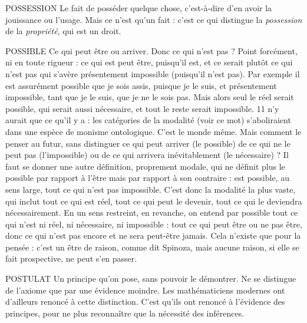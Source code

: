 POSSESSION Le fait de posséder quelque chose, c’est-à-dire d’en avoir la
jouissance ou l’usage. Mais ce n’est qu’un fait : c’est ce qui
distingue la {\it possession} de la {\it propriété}, qui est un droit.

POSSIBLE Ce qui peut être ou arriver. Donc ce qui n’est pas ? Point forcément,
ni en toute rigueur : ce qui est peut être, puisqu'il est, et
ce serait plutôt ce qui n’est pas qui s’avère présentement impossible (puisqu'il
n'est pas). Par exemple il est assurément possible que je sois assis, puisque je le
suis, et présentement impossible, tant que je le suis, que je ne le sois pas. Mais
alors seul le réel serait possible, qui serait aussi nécessaire, et tout le reste serait
impossible. 11 n’y aurait que ce qu’il y a : les catégories de la modalité (voir ce
mot) s’aboliraient dans une espèce de monisme ontologique. C’est le monde
même. Mais comment le penser au futur, sans distinguer ce qui peut arriver (le
possible) de ce qui ne le peut pas (l’impossible) ou de ce qui arrivera inévitablement
(le nécessaire) ? Il faut se donner une autre définition, proprement
modale, qui ne définit plus le possible par rapport à l'être mais par rapport à
son contraire : est possible, au sens large, tout ce qui n’est pas impossible. C’est
donc la modalité la plus vaste, qui inclut tout ce qui est réel, tout ce qui peut
le devenir, tout ce qui le deviendra nécessairement. En un sens restreint, en
revanche, on entend par possible tout ce qui n’est ni réel, ni nécessaire, ni
impossible : tout ce qui peut être ou ne pas être, donc ce qui n’est pas encore
et ne sera peut-être jamais. Cela n'existe que pour la pensée : c’est un être de
raison, comme dit Spinoza, mais aucune raison, si elle se fait prospective, ne
peut s’en passer.

POSTULAT Un principe qu’on pose, sans pouvoir le démontrer. Ne se distingue
de l’axiome que par une évidence moindre. Les mathématiciens
modernes ont d’ailleurs renoncé à cette distinction. C’est qu'ils ont
renoncé à l'évidence des principes, pour ne plus reconnaître que la nécessité des
inférences.

